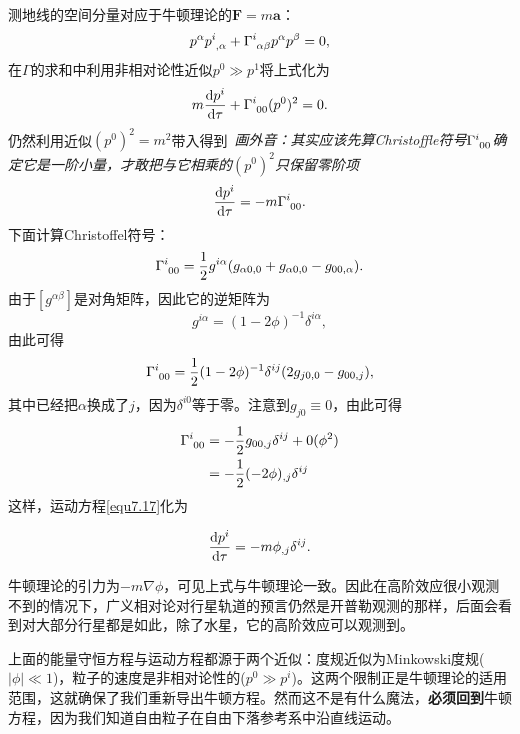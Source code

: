 测地线的空间分量对应于牛顿理论的$\bm{F} = m \bm{a}$：
\begin{equation}
    p^\alpha p\indices{^i_{, \alpha}} + \Gamma\indices{^i_{\alpha \beta}} p^\alpha p^\beta = 0,
\label{equ7.16}
\end{equation}
在$\Gamma$的求和中利用非相对论性近似$p^0 \gg p^1$将上式化为
\begin{equation}
    m \frac{\rd p^i}{\rd \tau} + \Gamma\indices{^i_{00}} (p^0)^2 = 0.
\label{equ7.17}
\end{equation}
仍然利用近似$(p^0)^2 = m^2$带入得到\ \textit{画外音：其实应该先算Christoffle符号$\Gamma\indices{^i_{00}}$确定它是一阶小量，才敢把与它相乘的$(p^0)^2$只保留零阶项 }
\begin{equation}
    \frac{\rd p^i}{\rd \tau} = -m \Gamma\indices{^i_{00}}.
\label{equ7.18}
\end{equation}
下面计算Christoffel符号：
\begin{equation}
    \Gamma\indices{^i_{00}} = \frac{1}{2} g^{i \alpha} (g_{\alpha 0, 0} + g_{\alpha 0, 0} - g_{00, \alpha}).
\label{equ7.19}
\end{equation}
由于$[g^{\alpha \beta}]$是对角矩阵，因此它的逆矩阵为
\begin{equation}
    g^{i \alpha} = (1 - 2\phi)^{-1} \delta^{i \alpha},
\label{equ7.20}
\end{equation}
由此可得
\begin{equation}
    \Gamma\indices{^i_{00}} = \frac{1}{2} (1 - 2\phi)^{-1} \delta^{ij} (2g_{j0, 0} - g_{00, j}),
\label{equ7.21}
\end{equation}
其中已经把$\alpha$换成了$j$，因为$\delta^{i0}$等于零。注意到$g_{j0} \equiv 0$，由此可得
\begin{align}
    \Gamma\indices{^i_{00}} &= -\frac{1}{2} g_{00, j} \delta^{ij} + 0(\phi^2) \label{equ7.22} \\
    &= -\frac{1}{2} (-2\phi)_{, j} \delta^{ij} \label{equ7.23}
\end{align}
这样，运动方程\eqref{equ7.17}化为
\begin{shaded}
\begin{equation}
    \frac{\mathrm{d} p^i}{\mathrm{d} \tau} = -m \phi_{, j} \delta^{ij}.
\label{equ7.24}
\end{equation}
\end{shaded}
牛顿理论的引力为$-m \nabla \phi$，可见上式与牛顿理论一致。因此在高阶效应很小观测不到的情况下，广义相对论对行星轨道的预言仍然是开普勒观测的那样，后面会看到对大部分行星都是如此，除了水星，它的高阶效应可以观测到。

上面的能量守恒方程与运动方程都源于两个近似：度规近似为Minkowski度规($|\phi| \ll 1$)，粒子的速度是非相对论性的($p^0 \gg p^i$)。这两个限制正是牛顿理论的适用范围，这就确保了我们重新导出牛顿方程。然而这不是有什么魔法，\textbf{必须回到}牛顿方程，因为我们知道自由粒子在自由下落参考系中沿直线运动。

